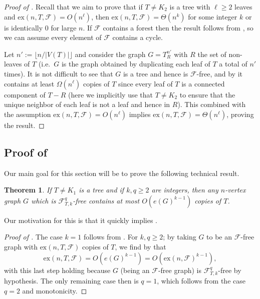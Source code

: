 \documentclass[12pt,letterpaper]{article}
\newtheorem{theorem}{Theorem}[section]
\theoremstyle{definition}
\newcommand{\pow}{q} %
\newcommand{\ex}{\mathrm{ex}}
\renewcommand{\c}[1]{\mathcal{#1}}
\begin{document}
	
	\begin{proof}[Proof of ]
		Recall that we aim to prove that if $T\ne K_2$ is a tree with $\ell\ge 2$ leaves and $\ex(n,T,\c{F})=O(n^{\ell})$, then $\ex(n,T,\c{F})=\Theta(n^k)$ for some integer $k$ or is identically 0 for large $n$.  If $\c{F}$ contains a forest then the result follows from , so we can assume every element of $\c{F}$ contains a cycle.  
		
		Let $n':=\lfloor n/|V(T)|\rfloor$ and consider the graph $G=T_R^{n'}$ with $R$ the set of non-leaves of $T$ (i.e.\ $G$ is the graph obtained by duplicating each leaf of $T$ a total of $n'$ times).  It is not difficult to see that $G$ is a tree and hence is $\c{F}$-free, and by  it contains at least $\Omega(n^\ell)$ copies of $T$ since every leaf of $T$ is a connected component of $T-R$ (here we implicitly use that $T\ne K_2$ to ensure that the unique neighbor of each leaf is not a leaf and hence in $R$).  This combined with the assumption $\ex(n,T,\c{F})=O(n^{\ell})$ implies $\ex(n,T,\c{F})=\Theta(n^\ell)$, proving the result.
	\end{proof}
	
	\subsection{Proof of \texorpdfstring{}{Theorem 5.3}}\label{subsection tree reduction}
	Our main goal for this section will be to prove the following technical result.
	
	\begin{theorem}\label{theorem:treeBoundEG}
		If $T\ne K_1$ is a tree and if $k,\pow\ge 2$ are integers, then any $n$-vertex graph $G$ which is $\c{F}_{T,k}^\pow$-free contains at most $O(e(G)^{k-1})$ copies of $T$. 
	\end{theorem}
	
	Our motivation for this is that it quickly implies .
	\begin{proof}[Proof of ]
		The case $k=1$ follows from . For $k,\pow\ge 2$; by taking $G$ to be an $\c{F}$-free graph with $\ex(n,T,\c{F})$ copies of $T$, we find by  that
		\[\ex(n,T,\c{F})=O(e(G)^{k-1})=O(\ex(n,\c{F})^{k-1}),\]
		with this last step holding because $G$ (being an $\c{F}$-free graph) is $\c{F}_{T,k}^q$-free by hypothesis. The only remaining case then is $\pow=1$, which follows from the case $\pow=2$ and monotonicity.
	\end{proof}
	
\end{document}

